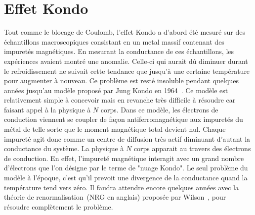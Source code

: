 

\section{Effet Kondo}

Tout comme le blocage de Coulomb, l'effet Kondo a d'abord été mesuré sur des échantillons macroscopiques consistant en un metal massif contenant des impuretés magnétiques. En mesurant la conductance de ces échantillons, les expériences avaient montré une anomalie. Celle-ci qui aurait d\^u diminuer durant le refroidissement ne suivait cette tendance que jusqu'à une certaine température pour augmenter à nouveau. Ce problème est resté insoluble pendant quelques années jusqu'au modèle proposé par Jung Kondo en 1964~\cite{Kondo1964}. Ce modèle est relativement simple à concevoir mais en revanche très difficile à résoudre car faisant appel à la physique à $N$ corps. Dans ce modèle, les électrons de conduction viennent se coupler de façon antiferromagnétique aux impuretés du métal de telle sorte que le moment magnétique total devient nul. Chaque impureté agit donc comme un centre de diffusion très actif diminuant d'autant la conductance du système. La physique à $N$ corps apparait au travers des électrons de conduction. En effet, l'impureté magnétique interagit avec un grand nombre d'électrons que l'on désigne par le terme de "nuage Kondo". Le seul problème du modèle à l'époque, c'est qu'il prevoit une divergence de la conductance quand la température tend vers zéro. Il faudra attendre encore quelques années avec la théorie de renormalisation~(NRG en anglais) proposée par Wilson~\cite{Wilson1975}, pour résoudre complètement le problème.

